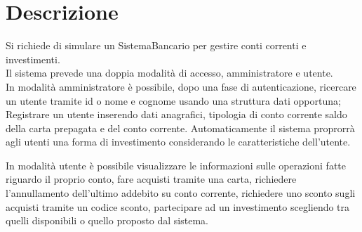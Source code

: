 \chapter{Descrizione} \label{cap1}
Si richiede di simulare un SistemaBancario per gestire conti correnti e investimenti. \\
Il sistema prevede una doppia modalit\`{a} di accesso, amministratore e utente. \\
In modalit\`{a} amministratore \`{e} possibile, dopo una fase di autenticazione, ricercare un utente tramite id o nome e cognome usando una struttura dati opportuna;
Registrare un utente inserendo dati anagrafici, tipologia di conto corrente saldo della carta prepagata e del conto corrente.
Automaticamente il sistema proprorr\`{a} agli utenti una forma di investimento considerando le caratteristiche dell'utente.

In modalit\`{a} utente \`{e} possibile visualizzare le informazioni sulle operazioni fatte riguardo il proprio conto, fare acquisti tramite una carta,
richiedere l'annullamento dell'ultimo addebito su conto corrente, richiedere uno sconto sugli acquisti tramite un codice sconto, partecipare ad un investimento scegliendo tra quelli disponibili o quello proposto dal sistema.